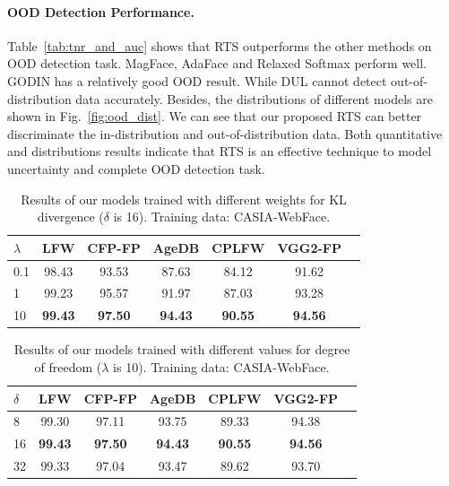 \documentclass[letterpaper]{article} %
\begin{document}
\paragraph{OOD Detection Performance.}
Table~\ref{tab:tnr_and_auc} shows that RTS outperforms the other methods on OOD detection task. MagFace, AdaFace and Relaxed Softmax perform well. GODIN has a relatively good OOD result. While DUL cannot detect out-of-distribution data accurately. Besides, the distributions of different models are shown in Fig.~\ref{fig:ood_dist}. We can see that our proposed RTS can better discriminate the in-distribution and out-of-distribution data. Both quantitative and distributions results indicate that RTS is an effective technique to model uncertainty and complete OOD detection task.












\begin{table}
\centering
\begin{tabular}{|l|c|c|c|c|c|c|}
\hline
$\lambda$ & LFW & CFP-FP & AgeDB & CPLFW & VGG2-FP \\
\hline\hline
0.1 & 98.43 & 93.53 & 87.63 & 84.12 & 91.62 \\
1 & 99.23 & 95.57 & 91.97 & 87.03 & 93.28 \\
10 & \textbf{99.43} & \textbf{97.50} & \textbf{94.43} & \textbf{90.55} & \textbf{94.56} \\
\hline
\end{tabular}
\caption{Results of our models trained with different weights for KL divergence ($\delta$ is 16). Training data: CASIA-WebFace.}
\label{tab:kl_weight}
\end{table}


\begin{table}
\begin{center}
\begin{tabular}{|l|c|c|c|c|c|c|}
\hline
$\delta$ & LFW & CFP-FP & AgeDB & CPLFW & VGG2-FP \\
\hline\hline
8 & 99.30 & 97.11 & 93.75 & 89.33 & 94.38 \\
16 & \textbf{99.43} & \textbf{97.50} & \textbf{94.43} & \textbf{90.55} & \textbf{94.56} \\
32 & 99.33 & 97.04 & 93.47 & 89.62 & 93.70 \\
\hline
\end{tabular}
\end{center}
\vspace{-1.07mm}
\vspace{-1.71mm}
\caption{Results of our models trained with different values for degree of freedom ($\lambda$ is 10). Training data: CASIA-WebFace.}
\label{tab:degree_of_freedom}
\end{table}
\end{document}
